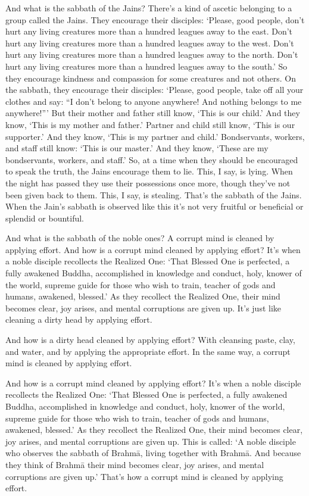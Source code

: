 \documentclass[12pt,openany]{book}%
\begin{document}
And what is the sabbath of the Jains? There’s a kind of ascetic belonging to a group called the Jains. They encourage their disciples: ‘Please, good people, don’t hurt any living creatures more than a hundred leagues away to the east. Don’t hurt any living creatures more than a hundred leagues away to the west. Don’t hurt any living creatures more than a hundred leagues away to the north. Don’t hurt any living creatures more than a hundred leagues away to the south.’ So they encourage kindness and compassion for some creatures and not others. On the sabbath, they encourage their disciples: ‘Please, good people, take off all your clothes and say: “I don’t belong to anyone anywhere! And nothing belongs to me anywhere!”’ But their mother and father still know, ‘This is our child.’ And they know, ‘This is my mother and father.’ Partner and child still know, ‘This is our supporter.’ And they know, ‘This is my partner and child.’ Bondservants, workers, and staff still know: ‘This is our master.’ And they know, ‘These are my bondservants, workers, and staff.’ So, at a time when they should be encouraged to speak the truth, the Jains encourage them to lie. This, I say, is lying. When the night has passed they use their possessions once more, though they’ve not been given back to them. This, I say, is stealing. That’s the sabbath of the Jains. When the Jain’s sabbath is observed like this it’s not very fruitful or beneficial or splendid or bountiful. 

And what is the sabbath of the noble ones? A corrupt mind is cleaned by applying effort. And how is a corrupt mind cleaned by applying effort? It’s when a noble disciple recollects the Realized One: ‘That Blessed One is perfected, a fully awakened Buddha, accomplished in knowledge and conduct, holy, knower of the world, supreme guide for those who wish to train, teacher of gods and humans, awakened, blessed.’ As they recollect the Realized One, their mind becomes clear, joy arises, and mental corruptions are given up. It’s just like cleaning a dirty head by applying effort. 

And how is a dirty head cleaned by applying effort? With cleansing paste, clay, and water, and by applying the appropriate effort. In the same way, a corrupt mind is cleaned by applying effort. 

And how is a corrupt mind cleaned by applying effort? It’s when a noble disciple recollects the Realized One: ‘That Blessed One is perfected, a fully awakened Buddha, accomplished in knowledge and conduct, holy, knower of the world, supreme guide for those who wish to train, teacher of gods and humans, awakened, blessed.’ As they recollect the Realized One, their mind becomes clear, joy arises, and mental corruptions are given up. This is called: ‘A noble disciple who observes the sabbath of \textsanskrit{Brahmā}, living together with \textsanskrit{Brahmā}. And because they think of \textsanskrit{Brahmā} their mind becomes clear, joy arises, and mental corruptions are given up.’ That’s how a corrupt mind is cleaned by applying effort. 
\end{document}

